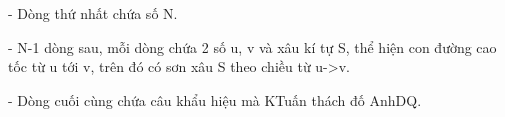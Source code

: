 - Dòng thứ nhất chứa số N.   


   - N-1 dòng sau, mỗi dòng chứa 2 số u, v và xâu kí tự S, thể hiện con đường cao tốc từ u tới v, trên đó có sơn xâu S theo chiều từ u->v.   


   - Dòng cuối cùng chứa câu khẩu hiệu mà KTuấn thách đố AnhDQ.